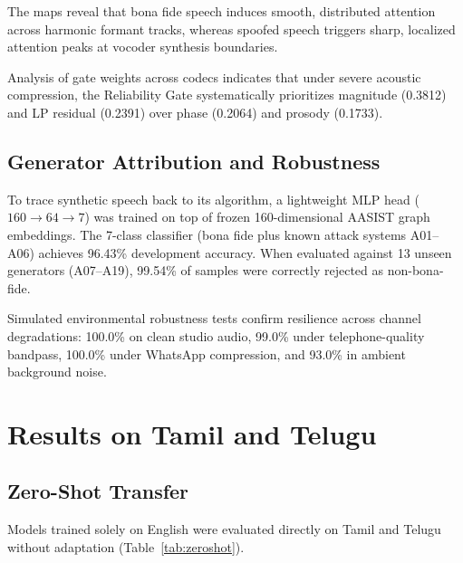 \documentclass[conference]{IEEEtran}
\begin{document}
The maps reveal that bona fide speech induces smooth, distributed attention across harmonic formant tracks, whereas spoofed speech triggers sharp, localized attention peaks at vocoder synthesis boundaries. 

Analysis of gate weights across codecs indicates that under severe acoustic compression, the Reliability Gate systematically prioritizes magnitude (0.3812) and LP residual (0.2391) over phase (0.2064) and prosody (0.1733).

\subsection{Generator Attribution and Robustness}
To trace synthetic speech back to its algorithm, a lightweight MLP head ($160 \to 64 \to 7$) was trained on top of frozen 160-dimensional AASIST graph embeddings. The 7-class classifier (bona fide plus known attack systems A01--A06) achieves 96.43\% development accuracy. When evaluated against 13 unseen generators (A07--A19), 99.54\% of samples were correctly rejected as non-bona-fide.

Simulated environmental robustness tests confirm resilience across channel degradations: 100.0\% on clean studio audio, 99.0\% under telephone-quality bandpass, 100.0\% under WhatsApp compression, and 93.0\% in ambient background noise.

\section{Results on Tamil and Telugu}

\subsection{Zero-Shot Transfer}
Models trained solely on English were evaluated directly on Tamil and Telugu without adaptation (Table~\ref{tab:zeroshot}).
\end{document}
